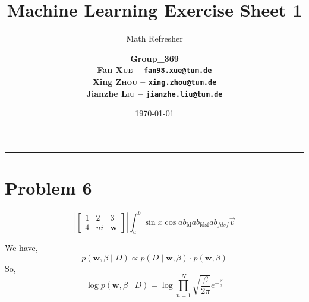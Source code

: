\documentclass[12pt]{scrartcl}
\title{\large Machine Learning Exercise Sheet 1}
\subtitle{\Large Math Refresher}
\author{\large\bfseries Group\_369 \\
        \large Fan \textsc{Xue} -- \texttt{fan98.xue@tum.de} \\
        \large Xing \textsc{Zhou} -- \texttt{xing.zhou@tum.de} \\
        \large Jianzhe \textsc{Liu} -- \texttt{jianzhe.liu@tum.de}}
\date{\large \today}
\newcommand{\vect}[1]{\boldsymbol{#1}}
\newcommand{\ve}{\vect}
\begin{document}
  \maketitle
  \vspace{-1cm}
  \noindent\rule{\textwidth}{0.4pt}
  \section*{Problem 6}
  \[ \left|\begin{bmatrix} 
    1 & 2 & 3 \\ 
    4 & ui & \ve{w}
\end{bmatrix} 
  \right| 
  \int_{a}^{b}  
  \sin x
  \cos ab
  _\text{fd} 
  ab_\text{fdsf} 
  ab_{fdsf}
  \vec{v}
  \] 

    
  We have, \[
  p\left( \ve{w}, \beta \mid D \right) \propto p\left( D\mid \ve{w}, \beta \right) \cdot p\left( \ve{w}, \beta \right) 
  \] 
  So,\[
  \log p\left( \ve{w}, \beta \mid D \right) = \log \prod_{n=1}^{N}\sqrt{ \frac{\beta}{2\pi} } e^{-\frac{\beta}{2}  }   
  \]
\end{document}
